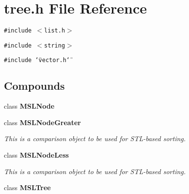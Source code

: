 \section{tree.h File Reference}
\label{tree_h}
{\tt \#include $<$list.h$>$}\par
{\tt \#include $<$string$>$}\par
{\tt \#include \char`\"{}vector.h\char`\"{}}\par
\subsection*{Compounds}
\begin{CompactItemize}
\item 
class {\bf MSLNode}
\item 
class {\bf MSLNode\-Greater}
\begin{CompactList}\small\item\em This is a comparison object to be used for STL-based sorting.\item\end{CompactList}\item 
class {\bf MSLNode\-Less}
\begin{CompactList}\small\item\em This is a comparison object to be used for STL-based sorting.\item\end{CompactList}\item 
class {\bf MSLTree}
\end{CompactItemize}
